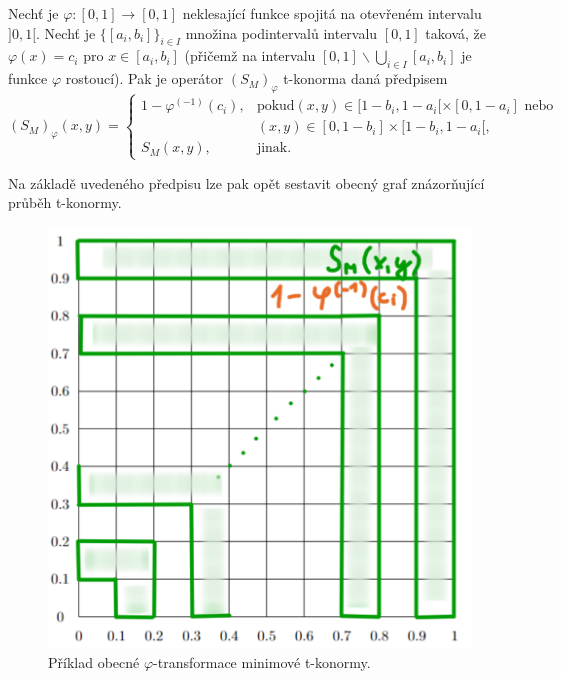 \begin{sentence}
\cite{mitav}
    \label{t-conorm}
 Nech\v t je $\varphi:[0,1]\rightarrow [0,1]$
neklesající funkce spojitá na otevřeném intervalu $]0,1[$.
Nech\v t je $\{[a_i,b_i]\}_{i\in I}$ množina podinterval\r u
intervalu $[0,1]$ taková, že $\varphi(x)=c_i$ pro $x\in
[a_i,b_i]$ (přičemž na intervalu $[0,1]\backslash \bigcup \limits_{i \in I}
[a_i,b_i]$ je funkce $\varphi$
rostoucí).
Pak je operátor $(S_M)_{\varphi}$  t-konorma daná předpisem
$$ (S_M)_{\varphi}(x,y) = \begin{cases} 1-\varphi^{(-1)}(c_i), &\mbox {pokud
$(x,y)\in [1-b_i,1-a_i[\times[0,1-a_i]$ nebo}
\\ & (x,y)\in [0,1-b_i]\times[1-b_i,1-a_i[,
\\ S_M(x,y), &\mbox {jinak.}
\end{cases} $$
\end{sentence}

Na základě uvedeného předpisu lze pak opět sestavit obecný graf znázor\v nující pr\r uběh t-konormy.
  
    \begin{figure}[H]
    \caption{Příklad obecné $\varphi$-transformace minimové t-konormy.}
                \hspace{-1cm}
                \includegraphics[scale=0.5]{template-fig/t-konorma.pdf}
                \centering
            \end{figure}


